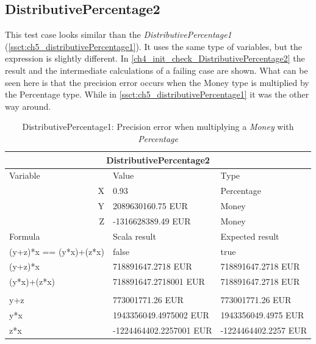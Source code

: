 \subsection{DistributivePercentage2}
This test case looks similar than the \textit{DistributivePercentage1} (\autoref{ssct:ch5_distributivePercentage1}). It uses the same type of variables, but the expression is slightly different. In \autoref{ch4_init_check_DistributivePercentage2} the result and the intermediate calculations of a failing case are shown. What can be seen here is that the precision error occurs when the Money type is multiplied by the Percentage type. While in \autoref{ssct:ch5_distributivePercentage1} it was the other way around.
\\
\begin{table}[h!]
\centering
\begin{tabular}{|lll|}
\hline
\multicolumn{3}{|c|}{DistributivePercentage2}                           \\ \hline
Variable               & Value                   & Type                 \\
\multicolumn{1}{|r}{X} & 0.93                    & Percentage           \\
\multicolumn{1}{|r}{Y} & 2089630160.75 EUR       & Money                \\
\multicolumn{1}{|r}{Z} & -1316628389.49 EUR      & Money                \\ \hline
Formula                & Scala result            & Expected result      \\
(y+z)*x == (y*x)+(z*x) & false                   & true                 \\
(y+z)*x                & 718891647.2718 EUR      & 718891647.2718 EUR   \\
(y*x)+(z*x)            & 718891647.2718001 EUR   & 718891647.2718 EUR   \\
                       &                         &                      \\
y+z                    & 773001771.26 EUR        & 773001771.26 EUR     \\
y*x                    & 1943356049.4975002 EUR  & 1943356049.4975 EUR  \\
z*x                    & -1224464402.2257001 EUR & -1224464402.2257 EUR \\ \hline
\end{tabular}
\caption{DistributivePercentage1: Precision error when multiplying a \textit{Money} with \textit{Percentage}}
\label{ch4_init_check_DistributivePercentage2}
\end{table}
\\

